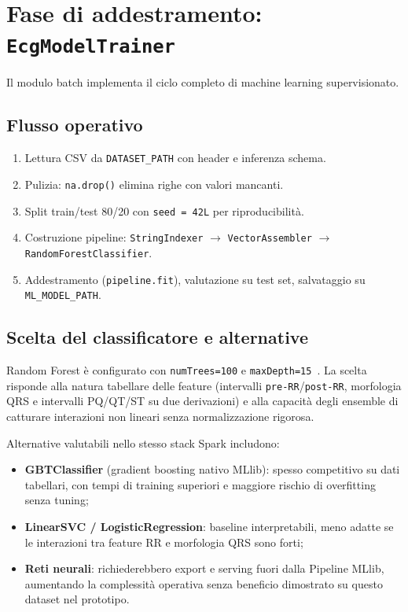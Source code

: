 \section{Fase di addestramento: \texttt{EcgModelTrainer}}\label{sec:ecg-model-trainer}

Il modulo batch implementa il ciclo completo di machine learning supervisionato.

\subsection{Flusso operativo}

\begin{enumerate}
  \item Lettura CSV da \texttt{DATASET\_PATH} con header e inferenza schema.
  \item Pulizia: \texttt{na.drop()} elimina righe con valori mancanti.
  \item Split train/test 80/20 con \texttt{seed = 42L} per riproducibilità.
  \item Costruzione pipeline: \texttt{StringIndexer} $\rightarrow$ \texttt{VectorAssembler} $\rightarrow$ \texttt{RandomForestClassifier}.
  \item Addestramento (\texttt{pipeline.fit}), valutazione su test set, salvataggio su \texttt{ML\_MODEL\_PATH}.
\end{enumerate}

\subsection{Scelta del classificatore e alternative}

Random Forest è configurato con \texttt{numTrees=100} e \texttt{maxDepth=15}~\cite{breiman2001random}.
La scelta risponde alla natura tabellare delle feature (intervalli \texttt{pre-RR}/\texttt{post-RR}, morfologia QRS e intervalli PQ/QT/ST su due derivazioni) e alla capacità degli ensemble di catturare interazioni non lineari senza normalizzazione rigorosa.

Alternative valutabili nello stesso stack Spark includono:
\begin{itemize}
  \item \textbf{GBTClassifier} (gradient boosting nativo MLlib): spesso competitivo su dati tabellari, con tempi di training superiori e maggiore rischio di overfitting senza tuning;
  \item \textbf{LinearSVC / LogisticRegression}: baseline interpretabili, meno adatte se le interazioni tra feature RR e morfologia QRS sono forti;
  \item \textbf{Reti neurali}: richiederebbero export e serving fuori dalla Pipeline MLlib, aumentando la complessità operativa senza beneficio dimostrato su questo dataset nel prototipo.
\end{itemize}

